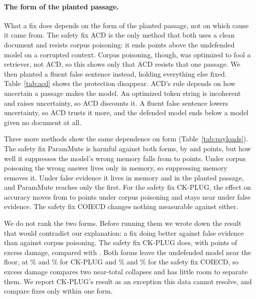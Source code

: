 \paragraph{The form of the planted passage.}
\label{sec:payloads}
What a fix does depends on the form of the planted
passage, not on which cause it came from. The safety fix ACD is the only method that both
uses a clean document and resists corpus poisoning: it ends
\EAcdSatGain{} points above the undefended model on a corrupted context.
Corpus poisoning, though, was optimized to fool a retriever, not ACD, so this
shows only that ACD resists that one passage. We then planted a fluent false
sentence instead, holding everything else fixed. Table~\ref{tab:acd} shows
the protection disappear. ACD's rule depends on how uncertain a passage makes the model. An optimized token string is incoherent and raises uncertainty, so ACD
discounts it. A fluent false sentence lowers uncertainty, so ACD trusts it
more, and the defended model ends below a model given no document at all.

Three more methods show the same dependence on form
(Table~\ref{tab:payloads}). The safety fix ParamMute is harmful against both forms, by
\EParamExcessCorpus{} and \EParamExcessFalse{} points, but how well it
suppresses the model's wrong memory falls from \EParamCorpusPmDrop{} to
\EParamFalsePmDrop{} points. Under corpus poisoning the wrong answer lives
only in memory, so suppressing memory removes it. Under false evidence it
lives in memory and in the planted passage, and ParamMute reaches only the
first. For the safety fix CK-PLUG, the effect on accuracy moves from \ECkCleanCost{} to
\ECkSatDelta{} points under corpus poisoning and stays near
\ECkFalseOffset{} under false evidence.
The safety fix COIECD changes nothing measurable against either.

We do not rank the two forms. Before running them we wrote down the result
that would contradict our explanation: a fix doing better against false
evidence than against corpus poisoning. The safety fix CK-PLUG does, with \ECkExcessFalse{}
points of excess damage, compared with \ECkExcessCorpus{}. Both forms leave the
undefended model near the floor, at \ECkUndefFalseCorrupt\% and
\ECkUndefCorpusCorrupt\% for CK-PLUG and \ECoiecdFalseCorrupt\% and
\ECoiecdCorpusCorrupt\% for the safety fix COIECD, so excess damage compares two near-total
collapses and has little room to separate them. We report CK-PLUG's result as
an exception this data cannot resolve, and compare fixes only within one
form.

